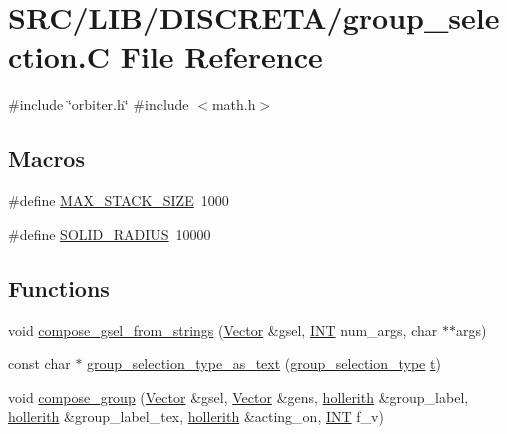 \hypertarget{group__selection_8_c}{}\section{S\+R\+C/\+L\+I\+B/\+D\+I\+S\+C\+R\+E\+T\+A/group\+\_\+selection.C File Reference}
\label{group__selection_8_c}
{\ttfamily \#include \char`\"{}orbiter.\+h\char`\"{}}\newline
{\ttfamily \#include $<$math.\+h$>$}\newline
\subsection*{Macros}
\begin{DoxyCompactItemize}
\item 
\#define \mbox{\hyperlink{group__selection_8_c_accbb358028675c83675d8b34c386268d}{M\+A\+X\+\_\+\+S\+T\+A\+C\+K\+\_\+\+S\+I\+ZE}}~1000
\item 
\#define \mbox{\hyperlink{group__selection_8_c_a121769f4ef23fe2bfde115b2d772b30e}{S\+O\+L\+I\+D\+\_\+\+R\+A\+D\+I\+US}}~10000
\end{DoxyCompactItemize}
\subsection*{Functions}
\begin{DoxyCompactItemize}
\item 
void \mbox{\hyperlink{group__selection_8_c_ad7e135c37a81df277ecc3cf7c0243388}{compose\+\_\+gsel\+\_\+from\+\_\+strings}} (\mbox{\hyperlink{class_vector}{Vector}} \&gsel, \mbox{\hyperlink{galois_8h_a09fddde158a3a20bd2dcadb609de11dc}{I\+NT}} num\+\_\+args, char $\ast$$\ast$args)
\item 
const char $\ast$ \mbox{\hyperlink{group__selection_8_c_ae9d06c32f57acbf2e64270fb8beaa2cc}{group\+\_\+selection\+\_\+type\+\_\+as\+\_\+text}} (\mbox{\hyperlink{discreta_8h_a9fbd019a849defc14910ae0a667c516e}{group\+\_\+selection\+\_\+type}} \mbox{\hyperlink{alphabet2_8_c_ac310d9181e916ba43604099aee272c71}{t}})
\item 
void \mbox{\hyperlink{group__selection_8_c_a335845a8b8fa5586b8337c05b482459d}{compose\+\_\+group}} (\mbox{\hyperlink{class_vector}{Vector}} \&gsel, \mbox{\hyperlink{class_vector}{Vector}} \&gens, \mbox{\hyperlink{classhollerith}{hollerith}} \&group\+\_\+label, \mbox{\hyperlink{classhollerith}{hollerith}} \&group\+\_\+label\+\_\+tex, \mbox{\hyperlink{classhollerith}{hollerith}} \&acting\+\_\+on, \mbox{\hyperlink{galois_8h_a09fddde158a3a20bd2dcadb609de11dc}{I\+NT}} f\+\_\+v)
\end{DoxyCompactItemize}


